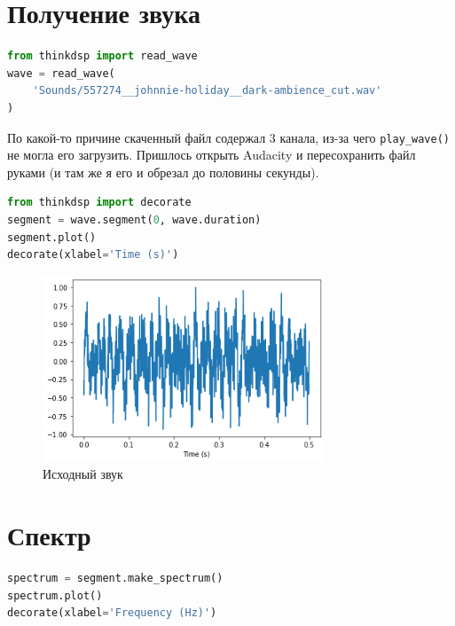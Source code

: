 \documentclass[a4paper,12pt]{report}
\begin{document}
    \section{Получение звука}
    
\begin{lstlisting}[language=Python,caption=Загрузка звука]
from thinkdsp import read_wave
wave = read_wave(
    'Sounds/557274__johnnie-holiday__dark-ambience_cut.wav'
)
\end{lstlisting}

    По какой-то причине скаченный файл содержал 3 канала, из-за чего \texttt{play\_wave()} не могла его загрузить. Пришлось открыть Audacity и пересохранить файл руками (и там же я его и обрезал до половины секунды).
    
\begin{lstlisting}[language=Python,caption=Визуализация]
from thinkdsp import decorate
segment = wave.segment(0, wave.duration)
segment.plot()
decorate(xlabel='Time (s)')
\end{lstlisting}

    \begin{figure}[H]
        \centering
        \includegraphics[width=0.75\textwidth]{ex2_source_waveform.png}
        \caption{Исходный звук}
        \label{fig:ex2_source_waveform}
    \end{figure}
    
    \section{Спектр}
    
\begin{lstlisting}[language=Python,caption=Спектр]
spectrum = segment.make_spectrum()
spectrum.plot()
decorate(xlabel='Frequency (Hz)')
\end{lstlisting}
\end{document}
